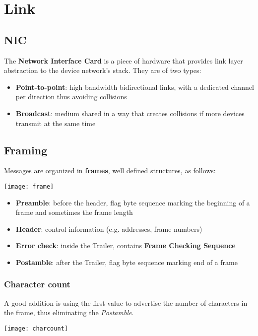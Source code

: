 \newpage
\section{Link}
\subsection{NIC}
The \textbf{Network Interface Card} is a piece of hardware that provides link layer abstraction to the device network's stack. They are of two types:
\begin{itemize}
	\item \textbf{Point-to-point}: high bandwidth bidirectional links, with a dedicated channel per direction thus avoiding collisions
	\item \textbf{Broadcast}: medium shared in a way that creates collisions if more devices transmit at the same time
\end{itemize}

\subsection{Framing}
Messages are organized in \textbf{frames}, well defined structures, as follows:
\begin{center}
	\texttt{[image: frame]}
\end{center}
\begin{itemize}
	\item \textbf{Preamble}: before the header, flag byte sequence marking the beginning of a frame and sometimes the frame length
	\item \textbf{Header}: control information (e.g. addresses, frame numbers)
	\item \textbf{Error check}: inside the Trailer, contains \textbf{Frame Checking Sequence}
	\item \textbf{Postamble}: after the Trailer, flag byte sequence marking end of a frame
\end{itemize}

\subsubsection{Character count} 
A good addition is using the first value to advertise the number of characters in the frame, thus eliminating the \textit{Postamble}.
\begin{center}
	\texttt{[image: charcount]}
\end{center}

